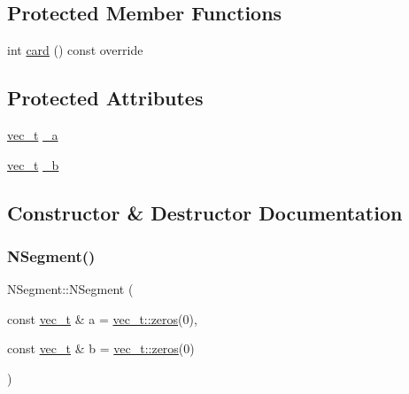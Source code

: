 \subsection*{Protected Member Functions}
\begin{DoxyCompactItemize}
\item 
int \mbox{\hyperlink{class_n_segment_a2fbe9d64e08f8aaa60d09ba8fe0ca2ba}{card}} () const override
\end{DoxyCompactItemize}
\subsection*{Protected Attributes}
\begin{DoxyCompactItemize}
\item 
\mbox{\hyperlink{group___n_algebra_ga0a2cfc67e738a3d73e4f12098c4c07f6}{vec\+\_\+t}} \mbox{\hyperlink{class_n_segment_ae97f9d86f36042b6d90f202c266c5fa2}{\+\_\+a}}
\item 
\mbox{\hyperlink{group___n_algebra_ga0a2cfc67e738a3d73e4f12098c4c07f6}{vec\+\_\+t}} \mbox{\hyperlink{class_n_segment_a46d4842dffd0446c07a92704dd527096}{\+\_\+b}}
\end{DoxyCompactItemize}


\subsection{Constructor \& Destructor Documentation}
\mbox{\label{class_n_segment_a15b93ff64168dac284abf4144148b194}} 
\subsubsection{\texorpdfstring{NSegment()}{NSegment()}}
{\footnotesize\ttfamily N\+Segment\+::\+N\+Segment (\begin{DoxyParamCaption}\item[{const \mbox{\hyperlink{group___n_algebra_ga0a2cfc67e738a3d73e4f12098c4c07f6}{vec\+\_\+t}} \&}]{a = {\ttfamily \mbox{\hyperlink{class_n_vector_a6253cef3c39dd9d388bbf7d17069bc51}{vec\+\_\+t\+::zeros}}(0)},  }\item[{const \mbox{\hyperlink{group___n_algebra_ga0a2cfc67e738a3d73e4f12098c4c07f6}{vec\+\_\+t}} \&}]{b = {\ttfamily \mbox{\hyperlink{class_n_vector_a6253cef3c39dd9d388bbf7d17069bc51}{vec\+\_\+t\+::zeros}}(0)} }\end{DoxyParamCaption})\hspace{0.3cm}{\ttfamily [explicit]}}



